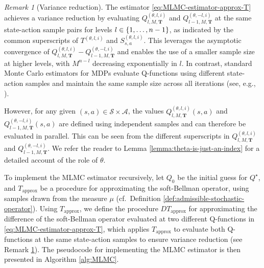 \documentclass[11pt]{article}
\numberwithin{equation}{section}
\theoremstyle{definition}
\theoremstyle{remark}
\newtheorem{remark}{Remark}[section]
\def\cA{\mathcal{A}}
\def\cS{\mathcal{S}}
\newcommand{\citet}{\cite}
\begin{document}
\begin{remark}[Variance reduction]
\label{rmk:Q_estimator}
The estimator  \eqref{eq:MLMC-estimator-approx-T}
achieves a   variance reduction 
by evaluating 
$ Q_{l,M,\mathbf T}^{(\theta,l,i)}$ and $ Q_{l-1,M,\mathbf T}^{(\theta,-l,i)}$
at the same state-action sample pairs
for   levels $l\in \{1,\ldots, \\ n-1\}$, as indicated by the common superscripts of   $T^{(\theta, l,i)}$ 
   and  $S_{s,a}^{(\theta,l,i)}$. 
   This leverages the asymptotic convergence of $Q_{l,M,\mathbf T}^{(\theta,l,i)}-Q_{l-1,M,\mathbf T}^{(\theta,-l,i)}$ and enables the use of a smaller sample size at higher levels, with $M^{n-l}$   decreasing exponentially in $l$. In contrast, standard Monte Carlo estimators for MDPs evaluate Q-functions using different state-action samples and maintain the same sample size across all iterations (see, e.g., \citet{kearns2002sparse}).
 
 
 However,  
 for any given  $(s,a)\in \cS\times \cA$,
 the values 
 $Q_{l,M,\mathbf T}^{(\theta,l,i)}(s,a)$
 and 
 $Q_{l-1,M,\mathbf T}^{(\theta,-l,i)}(s,a)$ are defined using independent samples and can therefore be evaluated in parallel. 
 This can be seen from 
 the different superscripts in  
 $Q_{l,M,\mathbf T}^{(\theta,l,i)}$
 and 
 $Q_{l-1,M,\mathbf T}^{(\theta,-l,i)}$.
 We refer the reader to Lemma \ref{lemma:theta-is-just-an-index} for a detailed account of the role of $\theta$.
  
 
\end{remark}

  To implement the   MLMC estimator recursively,
  let   $Q_0$
   be the initial guess for $Q^\star$,
  and $T_{\mathrm{approx}}$ be a procedure  for approximating the soft-Bellman operator,
using samples drawn from the measure  $\mu$ (cf.~Definition \ref{def:admissible-stochastic-operator}).
Using $T_{\mathrm{approx}}$,
we define  
the procedure  $DT_{\mathrm{approx}}$
 for approximating the difference of the soft-Bellman operator evaluated at two different Q-functions in \eqref{eq:MLMC-estimator-approx-T}, 
 which applies 
 $T_{\mathrm{approx}}$ to 
 evaluate  both Q-functions  at the same state-action samples
 to ensure variance reduction (see     Remark \ref{rmk:Q_estimator}).
The   pseudocode for implementing the MLMC estimator is then presented in Algorithm \ref{alg:MLMC}.
\end{document}
